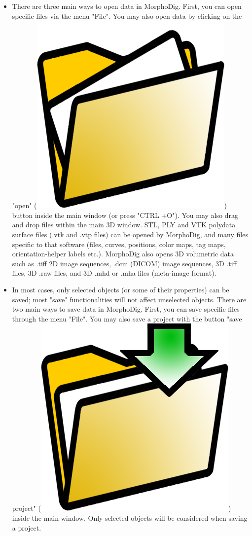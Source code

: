 \begin{itemize}
\item There are three main ways to open data in MorphoDig. First, you can open specific files via the menu "File". You may also open data by clicking on the "open" (\includegraphics[scale=0.03]{images/03/open_data.png}) button inside the main window (or press "CTRL +O"). You may also drag and drop files within the main 3D window.  
STL, PLY and VTK polydata surface files (.vtk and .vtp files) can be opened by MorphoDig, and many files specific to that software (files, curves, positions, color maps, tag maps, orientation-helper labels etc.). MorphoDig also opens 3D volumetric data such as .tiff 2D image sequences, .dcm (DICOM) image sequences, 3D .tiff files, 3D .raw files,  and 3D .mhd or .mha files (meta-image format).
\item In most cases, only selected objects (or some of their properties) can be saved; most "save" functionalities will not affect unselected objects. There are two main ways to save data in MorphoDig. First, you can save specific files through the menu "File". You may also save a project with the button "save project" (\includegraphics[scale=0.03]{images/03/save_data.png})  inside the main window. Only selected objects will be considered when saving a project.
\end{itemize}





